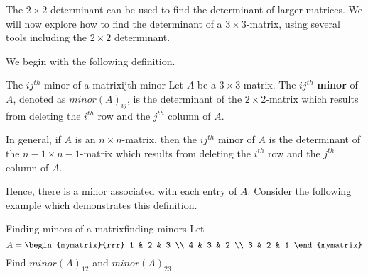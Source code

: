 The $2\times 2$ determinant can be used to find the determinant of
larger matrices.  We will now explore how to find the determinant of a
$3\times 3$-matrix, using several tools including the $2\times 2$
determinant.

We begin with the following definition. 

\begin{definition}{The $ij^{th}$ minor of a matrix}{ijth-minor}
  Let $A$ be a $3\times 3$-matrix. The $ij^{th}$
  \textbf{minor} of $A$, denoted as
  $minor(A) _{ij}$, is the determinant of the $2\times 2$-matrix which
  results from deleting the $i^{th}$ row and the $j^{th}$ column of
  $A$.

  In general, if $A$ is an $n\times n$-matrix, then the $ij^{th}$
  minor of $A$ is the determinant of the $n-1\times n-1$-matrix which
  results from deleting the $i^{th}$ row and the $j^{th}$ column of
  $A$.
\end{definition}

Hence, there is a minor associated with each entry of $A$. Consider
the following example which demonstrates this definition.

\begin{example}{Finding minors of a matrix}{finding-minors}
  Let 
  \begin{equation*}
    A = \begin{mymatrix}{rrr}
      1 & 2 & 3 \\
      4 & 3 & 2 \\
      3 & 2 & 1
    \end{mymatrix} 
  \end{equation*}
  Find $minor(A) _{12}$ and $minor(A) _{23}$.
\end{example}

